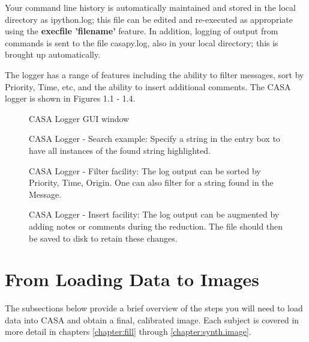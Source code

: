 Your command line history is automatically maintained and stored in
the local directory as ipython.log; this file can be edited and
re-executed as appropriate using the {\bf execfile 'filename'} feature.
In addition, logging of output from commands is sent to the file
casapy.log, also in your local directory; this is brought up
automatically.

The logger has a range of features including the ability to filter
messages, sort by Priority, Time, etc, and the ability to insert
additional comments. The CASA logger is shown in Figures 1.1 - 1.4.  

\begin{figure}[h!]
\caption{\label{fig:logger} CASA Logger GUI window}
\hrulefill
\end{figure}

\begin{figure}[h!]
\caption{\label{fig:logger_search} CASA Logger - Search example:
Specify a string in the entry box to
have all instances of the found string highlighted.}
\hrulefill
\end{figure}

\begin{figure}[h!]
\caption{\label{fig:logger_filter} CASA Logger - Filter facility: The
log output can be sorted by Priority, Time, Origin. One can also
filter for a string found in the Message.}  
\hrulefill
\end{figure}

\begin{figure}[h!]
\caption{\label{fig:logger_insert} CASA Logger - Insert facility: The
log output can be augmented by adding notes or comments during the
reduction. The file should then be saved to disk to retain these
changes.}
\hrulefill
\end{figure}


\section{From Loading Data to Images}
\label{section:data.to.images}

The subsections below provide a brief overview of the steps you will
need to load data into CASA and obtain a final, calibrated image.
Each subject is covered in more detail in chapters \ref{chapter:fill}
through \ref{chapter:synth.image}.


